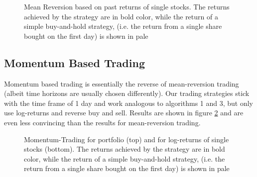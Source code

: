 \begin{figure}[h!]
    \centering
    \begin{adjustbox}{width=.95\textwidth,center}
        
    \end{adjustbox}  
    \caption{Mean Reversion based on past returns of single stocks. The returns achieved by the strategy are in bold color, while the return of a simple buy-and-hold strategy, (i.e. the return from a single share bought on the first day) is shown in pale}
    \label{fig:mean_reversion_returns}
\end{figure}{}

\subsection{Momentum Based Trading}
Momentum based trading is essentially the reverse of mean-reversion trading (albeit time horizons are usually chosen differently). Our trading strategies stick with the time frame of 1 day and work analogous to algorithms 1 and 3, but only use log-returns and reverse buy and sell. Results are shown in figure \ref{fig:momentum-trading} and are even less convincing than the results for mean-reversion trading. 

\begin{figure}[h!]
    \centering
    \begin{adjustbox}{width=.95\textwidth,center}
        
    \end{adjustbox}  
    \begin{adjustbox}{width=.95\textwidth,center}
        
    \end{adjustbox}      
    \caption{Momentum-Trading for portfolio (top) and for log-returns of single stocks (bottom). The returns achieved by the strategy are in bold color, while the return of a simple buy-and-hold strategy, (i.e. the return from a single share bought on the first day) is shown in pale}
    \label{fig:momentum-trading}
\end{figure}{}


